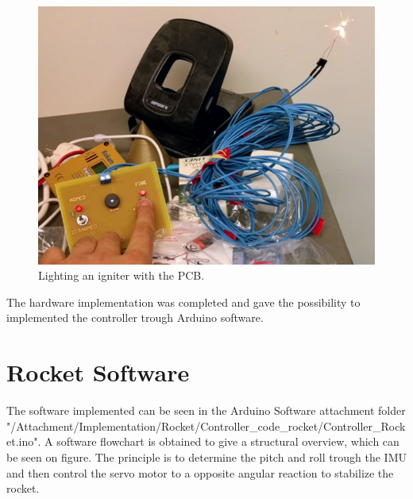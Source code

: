 \begin{figure} [h]
	\centering
	\includegraphics[width=0.9\linewidth]{figures/Rocket/implementation/igniter_PCB.png}
	\caption{Lighting an igniter with the PCB.}
	\label{fig:igniter_board}
\end{figure}

The hardware implementation was completed and gave the possibility to implemented the controller trough Arduino software.
\newpage
\section{Rocket Software}
The software implemented can be seen in the Arduino Software attachment folder "/Attachment/Implementation/Rocket/Controller_code_rocket/Controller_Rocket.ino". A software flowchart is obtained to give a structural overview, which can be seen on figure. The principle is to determine the pitch and roll trough the IMU and then control the servo motor to a opposite angular reaction to stabilize the rocket.  

